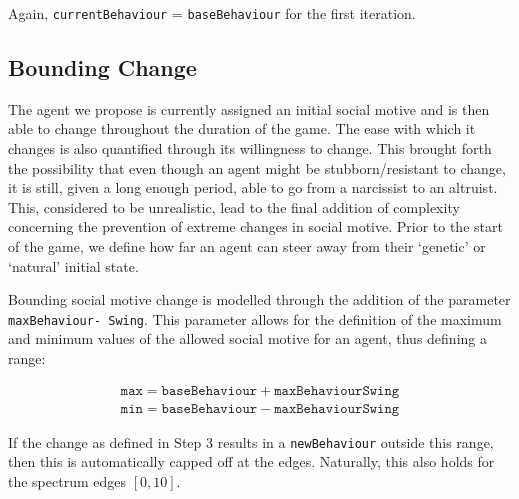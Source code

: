 Again, \texttt{currentBehaviour} = \texttt{baseBehaviour} for the first iteration.

\subsection{Bounding Change}
The agent we propose is currently assigned an initial social motive and is then able to change throughout the duration of the game. The ease with which it changes is also quantified through its willingness to change. This brought forth the possibility that even though an agent might be stubborn/resistant to change, it is still, given a long enough period, able to go from a narcissist to an altruist. This, considered to be unrealistic, lead to the final addition of complexity concerning the prevention of extreme changes in social motive. Prior to the start of the game, we define how far an agent can steer away from their `genetic' or `natural' initial state.

Bounding social motive change is modelled through the addition of the parameter \texttt{maxBehaviour- Swing}. This parameter allows for the definition of the maximum and minimum values of the allowed social motive for an agent, thus defining a range:

\vspace{0.2cm}
\begin{equation}
    \begin{gathered}
    \texttt{max} = \texttt{baseBehaviour} + \texttt{maxBehaviourSwing}  \\
    \texttt{min} = \texttt{baseBehaviour} - \texttt{maxBehaviourSwing}
    \end{gathered}
\end{equation}
\vspace{0.2cm}

If the change as defined in Step 3 results in a \texttt{newBehaviour} outside this range, then this is automatically capped off at the edges. Naturally, this also holds for the spectrum edges $[0,10]$.




